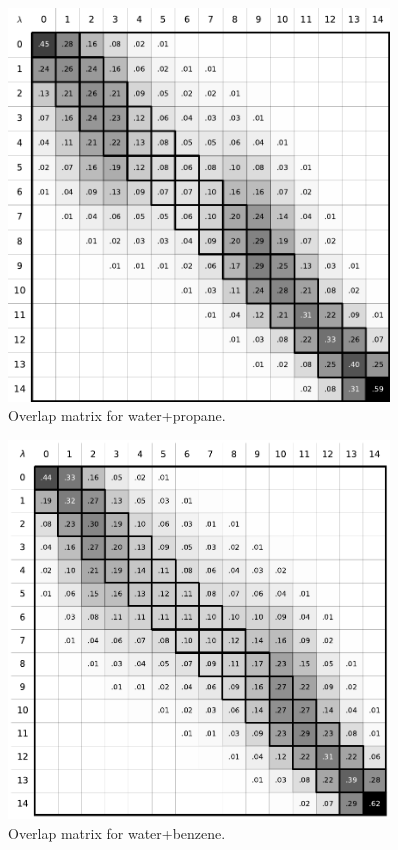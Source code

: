 \documentclass[
	12pt,				%
	openany,			%
	oneside,			%
	a4paper,			%
	english,			%
	brazil				%
	]{abntex2}
\begin{document}
\begin{apendicesenv}
\begin{figure}[H]
	\centering
	\includegraphics[width=0.9\textwidth]{Figures/owat_prop}
	\caption{Overlap matrix for water+propane.}
\end{figure}

\begin{figure}[H]
	\centering
	\includegraphics[width=0.9\textwidth]{Figures/owat_benz}
	\caption{Overlap matrix for water+benzene.}
\end{figure}


\end{apendicesenv}
\end{document}

